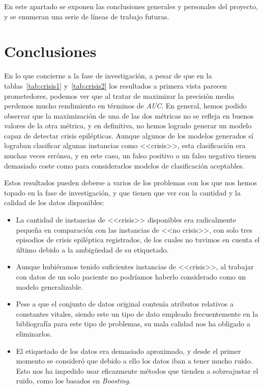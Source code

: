 
En este apartado se exponen las conclusiones generales y personales del proyecto, y se enumeran una serie de líneas de trabajo futuras. 

\section{Conclusiones}

En lo que concierne a la fase de investigación, a pesar de que en la tablas~\ref{tab:crisis1} y~\ref{tab:crisis2} los resultados a primera vista parecen prometedores, podemos ver que al tratar de maximizar la precisión media perdemos mucho rendimiento en términos de \textit{AUC}. En general, hemos podido observar que la maximización de una de las dos métricas no se refleja en buenos valores de la otra métrica, y en definitiva, no hemos logrado generar un modelo capaz de detectar crisis epilépticas. Aunque algunos de los modelos generados sí lograban clasificar algunas instancias como <<crisis>>, esta clasificación era muchas veces errónea, y en este caso, un falso positivo o un falso negativo tienen demasiado coste como para considerarlos modelos de clasificación aceptables. 

Estos resultados pueden deberse a varios de los problemas con los que nos hemos topado en la fase de investigación, y que tienen que ver con la cantidad y la calidad de los datos disponibles: 

\begin{itemize}
	\item La cantidad de instancias de <<crisis>> disponibles era radicalmente pequeña en comparación con las instancias de <<no crisis>>, con solo tres episodios de crisis epiléptica registrados, de los cuales no tuvimos en cuenta el último debido a la ambigüedad de su etiquetado. 
	\item Aunque hubiéramos tenido suficientes instancias de <<crisis>>, al trabajar con datos de un solo paciente no podríamos haberlo considerado como un modelo generalizable. 
	\item Pese a que el conjunto de datos original contenía atributos relativos a constantes vitales, siendo este un tipo de dato empleado frecuentemente en la bibliografía para este tipo de problemas, su mala calidad nos ha obligado a eliminarlos. 
	\item El etiquetado de los datos era demasiado aproximado, y desde el primer momento se consideró que debido a ello los datos iban a tener mucho ruido. Esto nos ha impedido usar eficazmente métodos que tienden a sobreajustar el ruido, como los basados en \textit{Boosting}. 
\end{itemize}

